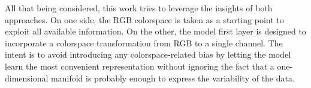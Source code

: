 All that being considered, this work tries to leverage the insights of both approaches. 
On one side, the RGB colorspace is taken as a starting point to exploit all available information. On the other, the model first layer is designed to incorporate a colorspace transformation from RGB to a single channel.
The intent is to avoid introducing any colorspace-related bias by letting the model learn the most convenient representation without ignoring the fact that a one-dimensional manifold is probably enough to express the variability of the data.
    
